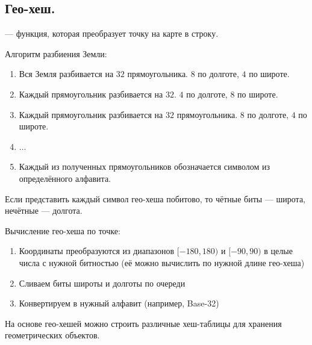 \subsection{Гео-хеш.}
\begin{definition}
   --- функция, которая преобразует точку на карте в строку. 
\end{definition}

Алгоритм разбиения Земли:
\begin{enumerate}
  \item Вся Земля разбивается на $32$ прямоугольника. $8$ по долготе, $4$ по широте.
  \item Каждый прямоугольник разбивается на $32$. $4$ по долготе, $8$ по широте.
  \item Каждый прямоугольник разбивается на $32$ прямоугольника. $8$ по долготе, $4$ по широте.
  \item $\ldots$
  \item Каждый из полученных прямоугольников обозначается символом из определённого алфавита.
\end{enumerate}

\begin{remark}
  Если представить каждый символ гео-хеша побитово, то чётные биты --- широта, нечётные --- долгота.
\end{remark}

Вычисление гео-хеша по точке:
\begin{enumerate}
  \item Координаты преобразуются из диапазонов $[-180, 180)$ и  $[-90, 90)$ в целые числа с нужной битностью
    (её можно вычислить по нужной длине гео-хеша)
  \item Сливаем биты широты и долготы по очереди
  \item Конвертируем в нужный алфавит (например, Base-32)
\end{enumerate}

\begin{remark}
  На основе гео-хешей можно строить различные хеш-таблицы для хранения геометрических объектов.
\end{remark}





